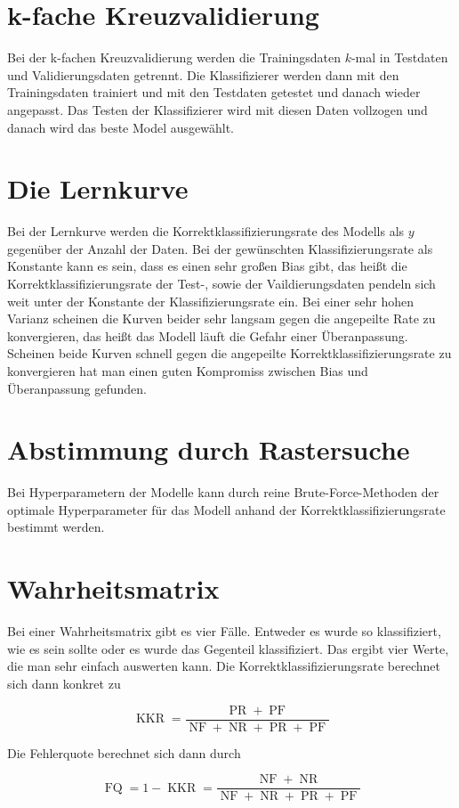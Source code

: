 \documentclass[11pt]{article} %
\DeclareMathOperator{\KKR}{KKR}
\DeclareMathOperator{\PR}{PR}
\DeclareMathOperator{\PF}{PF}
\DeclareMathOperator{\NF}{NF}
\DeclareMathOperator{\NR}{NR}
\DeclareMathOperator{\FQ}{FQ}
\begin{document}
\section{k-fache Kreuzvalidierung}
Bei der k-fachen Kreuzvalidierung werden die Trainingsdaten $k$-mal in Testdaten und Validierungsdaten getrennt. Die Klassifizierer werden dann mit den 
Trainingsdaten trainiert und mit den Testdaten getestet und danach wieder angepasst.  Das Testen der Klassifizierer wird mit diesen Daten vollzogen und 
danach wird das beste Model ausgewählt.
\section{Die Lernkurve}
Bei der Lernkurve werden die Korrektklassifizierungsrate des Modells als $y$ gegenüber der Anzahl der Daten. Bei der gewünschten Klassifizierungsrate als 
Konstante kann es sein, dass es einen sehr großen Bias gibt, das heißt die Korrektklassifizierungsrate der Test-, sowie der Vaildierungsdaten pendeln sich weit
unter der Konstante der Klassifizierungsrate ein. Bei einer sehr hohen Varianz scheinen die Kurven beider sehr langsam gegen die angepeilte Rate zu konvergieren,
das heißt das Modell läuft die Gefahr einer Überanpassung. Scheinen beide Kurven schnell gegen die angepeilte Korrektklassifizierungsrate zu konvergieren hat
man einen guten Kompromiss zwischen Bias und Überanpassung gefunden.
\section{Abstimmung durch Rastersuche}
Bei Hyperparametern der Modelle kann durch reine Brute-Force-Methoden der optimale Hyperparameter für das Modell anhand der Korrektklassifizierungsrate bestimmt werden.
\section{Wahrheitsmatrix}
Bei einer Wahrheitsmatrix gibt es vier Fälle. Entweder es wurde so klassifiziert, wie es sein sollte oder es wurde das Gegenteil klassifiziert. Das ergibt vier Werte, die man sehr einfach auswerten kann. 
Die Korrektklassifizierungsrate berechnet sich dann konkret zu

\begin{equation}
\KKR = \frac{\PR+\PF}{\NF+\NR+\PR+\PF}
\end{equation}

Die Fehlerquote berechnet sich dann durch

\begin{equation}
\FQ = 1-\KKR = \frac{\NF+\NR}{\NF+\NR+\PR+\PF}
\end{equation}
\end{document}
